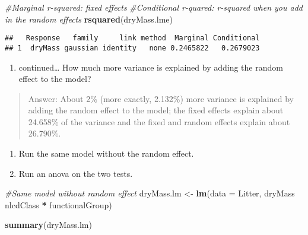\documentclass[]{article}
\newenvironment{Shaded}{\begin{snugshade}}{\end{snugshade}}
\newcommand{\CommentTok}[1]{\textcolor[rgb]{0.56,0.35,0.01}{\textit{#1}}}
\newcommand{\DataTypeTok}[1]{\textcolor[rgb]{0.13,0.29,0.53}{#1}}
\newcommand{\KeywordTok}[1]{\textcolor[rgb]{0.13,0.29,0.53}{\textbf{#1}}}
\newcommand{\NormalTok}[1]{#1}
\newcommand{\OperatorTok}[1]{\textcolor[rgb]{0.81,0.36,0.00}{\textbf{#1}}}
\newcommand{\StringTok}[1]{\textcolor[rgb]{0.31,0.60,0.02}{#1}}
\providecommand{\tightlist}{%
  \setlength{\itemsep}{0pt}\setlength{\parskip}{0pt}}
\begin{document}
\begin{Shaded}
\begin{Highlighting}[]
\CommentTok{#Marginal r-squared: fixed effects}
\CommentTok{#Conditional r-quared: r-squared when you add in the random effects}
\KeywordTok{rsquared}\NormalTok{(dryMass.lme)}
\end{Highlighting}
\end{Shaded}

\begin{verbatim}
##   Response   family     link method  Marginal Conditional
## 1  dryMass gaussian identity   none 0.2465822   0.2679023
\end{verbatim}

\begin{enumerate}
\def\labelenumi{\alph{enumi}.}
\setcounter{enumi}{1}
\tightlist
\item
  continued\ldots{} How much more variance is explained by adding the
  random effect to the model?
\end{enumerate}

\begin{quote}
Answer: About 2\% (more exactly, 2.132\%) more variance is explained by
adding the random effect to the model; the fixed effects explain about
24.658\% of the variance and the fixed and random effects explain about
26.790\%.
\end{quote}

\begin{enumerate}
\def\labelenumi{\alph{enumi}.}
\setcounter{enumi}{2}
\tightlist
\item
  Run the same model without the random effect.
\item
  Run an anova on the two tests.
\end{enumerate}

\begin{Shaded}
\begin{Highlighting}[]
\CommentTok{#Same model without random effect}
\NormalTok{dryMass.lm <-}\StringTok{ }\KeywordTok{lm}\NormalTok{(}\DataTypeTok{data =}\NormalTok{ Litter, }
\NormalTok{              dryMass }\OperatorTok{~}\StringTok{ }\NormalTok{nlcdClass }\OperatorTok{*}\StringTok{ }\NormalTok{functionalGroup)}

\KeywordTok{summary}\NormalTok{(dryMass.lm)}
\end{Highlighting}
\end{Shaded}
\end{document}

